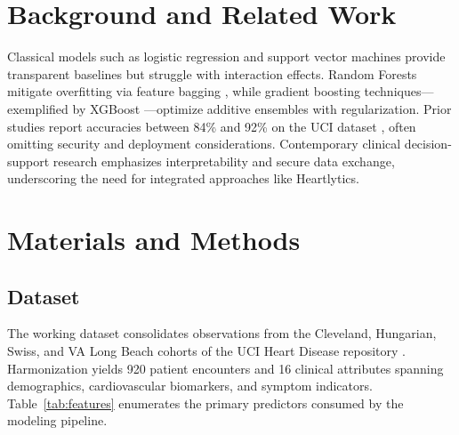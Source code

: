 \documentclass[conference]{IEEEtran}
\begin{document}
\section{Background and Related Work}
Classical models such as logistic regression and support vector machines provide transparent baselines but struggle with interaction effects. Random Forests mitigate overfitting via feature bagging \cite{breiman2001random}, while gradient boosting techniques---exemplified by XGBoost \cite{chen2016xgboost}---optimize additive ensembles with regularization. Prior studies report accuracies between 84\% and 92\% on the UCI dataset \cite{zhang2021heart}, often omitting security and deployment considerations. Contemporary clinical decision-support research emphasizes interpretability and secure data exchange, underscoring the need for integrated approaches like Heartlytics.

\section{Materials and Methods}
\label{sec:methods}
\subsection{Dataset}
The working dataset consolidates observations from the Cleveland, Hungarian, Swiss, and VA Long Beach cohorts of the UCI Heart Disease repository \cite{janosi1988uci}. Harmonization yields 920 patient encounters and 16 clinical attributes spanning demographics, cardiovascular biomarkers, and symptom indicators. Table~\ref{tab:features} enumerates the primary predictors consumed by the modeling pipeline.
\end{document}
